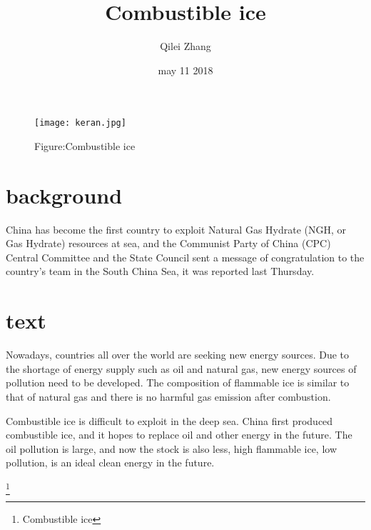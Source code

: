 \documentclass[twocolumn]{article}
\begin{document}
\title{Combustible ice}
\author{Qilei Zhang}
\date{may 11 2018}
\maketitle
\par
\begin{figure}[htbp]
\small
\centering
\texttt{[image: keran.jpg]}
\caption{Figure:Combustible ice}
\label{fig:lable}
\end{figure}
\par
\section{background}
China has become the first country to exploit Natural Gas Hydrate (NGH, or Gas Hydrate) resources at sea, and the Communist Party of China (CPC) Central Committee and the State Council sent a message of congratulation to the country's team in the South China Sea, it was reported last Thursday.
\par
\section{text}
Nowadays, countries all over the world are seeking new energy sources. Due to the shortage of energy supply such as oil and natural gas, new energy sources of pollution need to be developed. The composition of flammable ice is similar to that of natural gas and there is no harmful gas emission after combustion.\cite{higham1994bibtex}
\par
Combustible ice is difficult to exploit in the deep sea. China first produced combustible ice, and it hopes to replace oil and other energy in the future. The oil pollution is large, and now the stock is also less, high flammable ice, low pollution, is an ideal clean energy in the future.

\par
\footnote{\centering Combustible ice}
\end{document}
